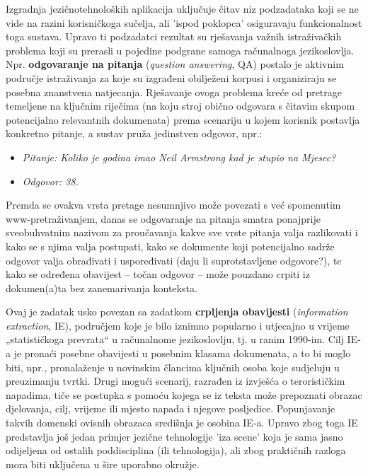 \begin{multicols}{2}
Izgradnja jezičnotehnoloških aplikacija uključuje čitav niz podzadataka koji se ne vide na razini korisničkoga sučelja, ali 'ispod poklopca' osiguravaju funkcionalnost toga sustava. Upravo ti podzadatci rezultat su rješavanja važnih istraživačkih problema koji su prerasli u pojedine podgrane samoga računalnoga jezikoslovlja. Npr. \textbf{odgovaranje na pitanja} (\emph{question answering}, QA) postalo je aktivnim područje istraživanja za koje su izgrađeni obilježeni korpusi i organiziraju se posebna znanstvena natjecanja. Rješavanje ovoga problema kreće od pretrage temeljene na ključnim riječima (na koju stroj obično odgovara s čitavim skupom potencijalno relevantnih dokumenata) prema scenariju u kojem korisnik postavlja konkretno pitanje, a sustav pruža jedinstven odgovor, npr.:
		
\begin{itemize}
\item[] \textit{Pitanje: Koliko je godina imao Neil Armstrong kad je stupio na Mjesec?}
\item[] \textit{Odgovor: 38.}
\end{itemize}

Premda se ovakva vrsta pretage nesumnjivo može povezati s već spomenutim www-pretraživanjem, danas se odgovaranje na pitanja smatra ponajprije sveobuhvatnim nazivom za proučavanja kakve sve vrste pitanja valja razlikovati i kako se s njima valja postupati, kako se dokumente koji potencijalno sadrže odgovor valja obrađivati i uspoređivati (daju li suprotstavljene odgovore?), te kako se određena obavijest – točan odgovor – može pouzdano crpiti iz dokumen(a)ta bez zanemarivanja konteksta. 


Ovaj je zadatak usko povezan sa zadatkom \textbf{crpljenja obavijesti} (\emph{information extraction}, IE), područjem koje je bilo iznimno popularno i utjecajno u vrijeme „statističkoga prevrata“ u računalnome jezikoslovlju, tj. u ranim 1990-im. Cilj IE-a je pronaći posebne obavijesti u posebnim klasama dokumenata, a to bi moglo biti, npr., pronalaženje u novinskim člancima ključnih osoba koje sudjeluju u preuzimanju tvrtki. Drugi mogući scenarij, razrađen iz izvješća o terorističkim napadima, tiče se postupka s pomoću kojega se iz teksta može prepoznati obrazac djelovanja, cilj, vrijeme ili mjesto napada i njegove posljedice. Popunjavanje takvih domenski ovisnih obrazaca središnja je osobina IE-a. Upravo zbog toga IE predstavlja još jedan primjer jezične tehnologije 'iza scene' koja je sama jasno odijeljena od ostalih poddisciplina (ili tehnologija), ali zbog praktičnih razloga mora biti uključena u šire uporabno okružje.


\end{multicols}
